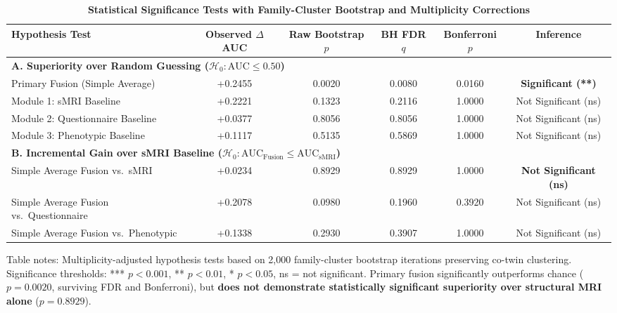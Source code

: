 \documentclass[10pt,letterpaper]{article}
\begin{document}
\begin{table}[!t]
\begin{adjustwidth}{-2.25in}{0in}
\centering
\caption{\textbf{Statistical Significance Tests with Family-Cluster Bootstrap and Multiplicity Corrections}}
\label{tab:stat_tests}
\footnotesize
\renewcommand{\arraystretch}{1.25}
\begin{tabular}{|l|c|c|c|c|c|}
\hline
\textbf{Hypothesis Test} & \textbf{Observed $\Delta$AUC} & \textbf{Raw Bootstrap $p$} & \textbf{BH FDR $q$} & \textbf{Bonferroni $p$} & \textbf{Inference} \\
\hline
\multicolumn{6}{|l|}{\textbf{A. Superiority over Random Guessing ($\mathcal{H}_0: \text{AUC} \le 0.50$)}} \\
\hline
Primary Fusion (Simple Average) & +0.2455 & 0.0020 & 0.0080 & 0.0160 & \textbf{Significant (**)} \\
\hline
Module 1: sMRI Baseline & +0.2221 & 0.1323 & 0.2116 & 1.0000 & Not Significant (ns) \\
\hline
Module 2: Questionnaire Baseline & +0.0377 & 0.8056 & 0.8056 & 1.0000 & Not Significant (ns) \\
\hline
Module 3: Phenotypic Baseline & +0.1117 & 0.5135 & 0.5869 & 1.0000 & Not Significant (ns) \\
\hline
\multicolumn{6}{|l|}{\textbf{B. Incremental Gain over sMRI Baseline ($\mathcal{H}_0: \text{AUC}_{\text{Fusion}} \le \text{AUC}_{\text{sMRI}}$)}} \\
\hline
Simple Average Fusion vs.\ sMRI & +0.0234 & 0.8929 & 0.8929 & 1.0000 & \textbf{Not Significant (ns)} \\
\hline
Simple Average Fusion vs.\ Questionnaire & +0.2078 & 0.0980 & 0.1960 & 0.3920 & Not Significant (ns) \\
\hline
Simple Average Fusion vs.\ Phenotypic & +0.1338 & 0.2930 & 0.3907 & 1.0000 & Not Significant (ns) \\
\hline
\end{tabular}
\begin{flushleft}
Table notes: Multiplicity-adjusted hypothesis tests based on 2,000 family-cluster bootstrap iterations preserving co-twin clustering. Significance thresholds: *** $p < 0.001$, ** $p < 0.01$, * $p < 0.05$, ns = not significant. Primary fusion significantly outperforms chance ($p = 0.0020$, surviving FDR and Bonferroni), but \textbf{does not demonstrate statistically significant superiority over structural MRI alone} ($p = 0.8929$).
\end{flushleft}
\end{adjustwidth}
\end{table}
\end{document}
